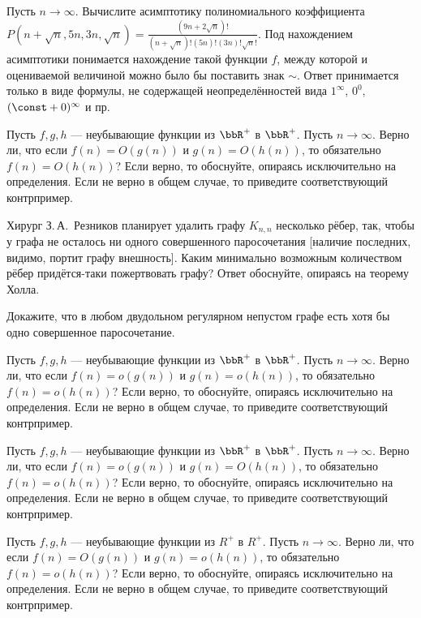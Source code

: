 Пусть $n\to\infty$. Вычислите асимптотику полиномиального коэффициента $P(n+\sqrt{n},5n,3n,\sqrt{n})=\frac{(9n+2\sqrt{n})!}{(n+\sqrt{n})!(5n)!(3n)!\sqrt{n}!}$.
Под нахождением асимптотики понимается нахождение такой функции $f$, между которой и оцениваемой величиной можно было бы поставить знак $\sim$. Ответ принимается только в виде формулы, не содержащей неопределённостей вида $1^{\infty}$, $0^0$, $(\const+0)^\infty$ и пр.

Пусть $f,g,h$ — неубывающие функции из $\bbR^{+}$ в $\bbR^{+}$. Пусть $n\to\infty$. Верно ли, что если $f(n)=O(g(n))$ и $g(n)=O(h(n))$, то обязательно $f(n)=O(h(n))$? Если верно, то обоснуйте, опираясь исключительно на определения. Если не верно в общем случае, то приведите соответствующий контрпример.

Хирург З.\,А.~Резников планирует удалить графу $K_{n,n}$ несколько рёбер, так, чтобы у графа не осталось ни одного совершенного паросочетания [наличие последних, видимо, портит графу внешность]. Каким минимально возможным количеством рёбер придётся-таки пожертвовать графу? Ответ обоснуйте, опираясь на теорему Холла.

Докажите, что в любом двудольном регулярном непустом графе есть хотя бы одно совершенное паросочетание.

Пусть $f,g,h$ — неубывающие функции из $\bbR^{+}$ в $\bbR^{+}$. Пусть $n\to\infty$. Верно ли, что если $f(n)=o(g(n))$ и $g(n)=o(h(n))$, то обязательно $f(n)=o(h(n))$? Если верно, то обоснуйте, опираясь исключительно на определения. Если не верно в общем случае, то приведите соответствующий контрпример.

Пусть $f,g,h$ — неубывающие функции из $\bbR^{+}$ в $\bbR^{+}$. Пусть $n\to\infty$. Верно ли, что если $f(n)=o(g(n))$ и $g(n)=O(h(n))$, то обязательно $f(n)=o(h(n))$? Если верно, то обоснуйте, опираясь исключительно на определения. Если не верно в общем случае, то приведите соответствующий контрпример.

Пусть $f,g,h$ — неубывающие функции из $R^{+}$ в $R^{+}$. Пусть $n\to\infty$. Верно ли, что если $f(n)=O(g(n))$ и $g(n)=o(h(n))$, то обязательно $f(n)=o(h(n))$? Если верно, то обоснуйте, опираясь исключительно на определения. Если не верно в общем случае, то приведите соответствующий контрпример.

